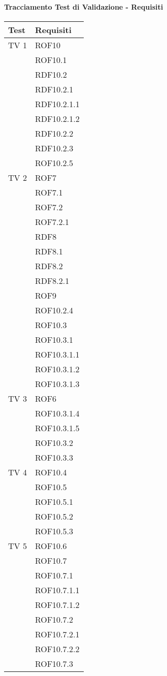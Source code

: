 \paragraph{Tracciamento Test di Validazione - Requisiti}
\begin{center}
\begin{longtable}{|p{7cm}|p{7cm}|}
\toprule
\textbf{Test} & \textbf{Requisiti}\\
\midrule
TV 1 & ROF10\\ & ROF10.1\\ & RDF10.2\\ & RDF10.2.1\\ &  RDF10.2.1.1\\ &  RDF10.2.1.2\\ &  RDF10.2.2 \\ & RDF10.2.3\\ &   ROF10.2.5\\
\midrule
TV 2 & ROF7\\ &  ROF7.1\\ &  ROF7.2\\ &  ROF7.2.1\\ &  RDF8\\ &  RDF8.1\\ &  RDF8.2\\ &  RDF8.2.1\\ &  ROF9\\ &  ROF10.2.4\\ &  ROF10.3\\ &  ROF10.3.1\\ &  ROF10.3.1.1\\ &  ROF10.3.1.2\\ &  ROF10.3.1.3\\
\midrule
TV 3 & ROF6\\ &  ROF10.3.1.4\\ &  ROF10.3.1.5\\ &  ROF10.3.2\\ &  ROF10.3.3\\
\midrule
TV 4 &  ROF10.4\\ &  ROF10.5\\ &  ROF10.5.1\\ &  ROF10.5.2\\ &  ROF10.5.3\\
\midrule
TV 5 &  ROF10.6\\ &  ROF10.7\\ &  ROF10.7.1\\ &  ROF10.7.1.1\\ &  ROF10.7.1.2\\ &  ROF10.7.2\\ &  ROF10.7.2.1\\ &  ROF10.7.2.2\\ &  ROF10.7.3\\

\end{longtable}
\end{center}
